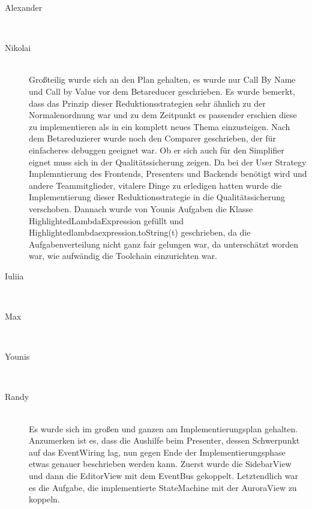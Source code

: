 \documentclass[parskip=full,11pt,twoside]{scrartcl}
\begin{document}
\begin{description}

\item [Alexander]\hfill \\
\item [Nikolai]\hfill \\
Großteilig wurde sich an den Plan gehalten, es wurde nur Call By Name und Call by Value vor dem Betareducer geschrieben.
Es wurde  bemerkt, dass das Prinzip dieser Reduktionsstrategien sehr ähnlich zu der Normalenordnung war und zu dem Zeitpunkt es passender erschien diese zu implementieren als in ein komplett neues Thema einzusteigen.
Nach dem Betareduzierer wurde noch den Comparer geschrieben, der für einfacheres debuggen geeignet war. Ob er sich auch für den Simplifier eignet muss sich in der Qualitätssicherung zeigen.
Da bei der User Strategy Implemntierung des Frontends, Presenters und Backends benötigt wird und andere Teammitglieder, vitalere Dinge zu erledigen hatten
wurde die Implementierung dieser Reduktionsstrategie in die Qualitätssicherung verschoben.
Dannach wurde von Younis Aufgaben die Klasse HighlightedLambdaExpression gefüllt und  Highlightedlambdaexpression.toString(t) geschrieben, da die Aufgabenverteilung nicht ganz fair gelungen war, da unterschätzt worden war, wie aufwändig die Toolchain einzurichten war.

\item [Iuliia]\hfill \\
\item [Max]\hfill \\
\item [Younis]\hfill \\
\item [Randy]\hfill \\
Es wurde sich im großen und ganzen am Implementierungsplan gehalten. Anzumerken ist es, dass die Aushilfe beim Presenter, dessen Schwerpunkt auf das EventWiring lag, nun gegen
Ende der Implementierungsphase etwas genauer beschrieben werden kann. Zuerst wurde die SidebarView und dann die EditorView mit dem EventBus gekoppelt.
Letztendlich war es die Aufgabe, die implementierte StateMachine mit der AuroraView zu koppeln.
    
\end{description}
\end{document}
